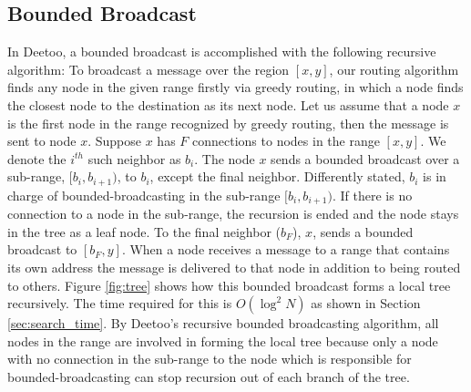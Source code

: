 \documentclass[conference]{IEEEtran}
\begin{document}
\subsection{Bounded Broadcast}
\label{sec:broadcast}

In Deetoo, a bounded broadcast is accomplished with the following 
recursive algorithm:  
To broadcast a message over the region $[x, y]$, 
our routing algorithm finds any node in the given range firstly via greedy routing,
in which a node finds the closest node to the destination as its next node.
Let us assume that a node $x$ is the first node in the range recognized by greedy routing, 
then the message is sent to node $x$. 
Suppose $x$ has $F$ connections to nodes in the range $[x, y]$. 
We denote the $i^{th}$ such neighbor as $b_i$.
The node $x$ sends a bounded broadcast over a sub-range, 
$[b_i, b_{i+1})$, to $b_i$, except the final neighbor. 
Differently stated, $b_i$ is in charge of bounded-broadcasting 
in the sub-range $[b_i, b_{i+1})$. If there is no connection to a node in the sub-range, 
the recursion is ended and the node stays in the tree as a leaf node.
To the final
neighbor ($b_F$), $x$, sends a bounded broadcast to $[b_F, y]$.
When a node receives a message to a range that contains its own address
the message is delivered to that node in addition to being routed to others.
Figure \ref{fig:tree} shows how this bounded broadcast forms a local 
tree recursively. The time required for this is $O(\log^2 N)$ as 
shown in Section \ref{sec:search_time}.
By Deetoo's recursive bounded broadcasting algorithm, all nodes in the range 
are involved in forming the local tree because only a node with no connection 
in the sub-range to the node which is responsible for bounded-broadcasting 
can stop recursion out of each branch of the tree.
\end{document}
